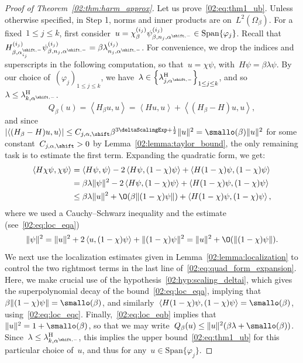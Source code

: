 \begin{proof}[Proof of Theorem~\ref{02:thm:harm_approx}]
        Let us prove~\eqref{02:eq:thm1_ub}. Unless otherwise specified, in Step 1, norms and inner products are on~$L^2(\Omega_\beta)$.
        For a fixed~$1\leq j\leq k$, first consider~$u = \chi_\beta^{(i_j)} \psi_{\beta,n_j,\alpha^{\shift,-}}^{(i_j)} \in \mathrm{Span}\{\varphi_j\}$. Recall that~$H_{\beta,\alpha_{i_j}^{\shift,-}}^{(i_j)}\psi_{\beta,n_j,\alpha^{\shift,-}}^{(i_j)} = \beta \lambda_{n_j,\alpha^{\shift,-}}^{(i_j)}$. For convenience, we drop the indices and superscripts in the following computation, so that~${u=\chi\psi}$, with~$H \psi = \beta\lambda\psi$.
        By our choice of~$(\varphi_j)_{1\leq j\leq k}$, we have~${\lambda \in \left\{\lambda_{j,\alpha^{\shift,-}}^{\mathrm H}\right\}_{1\leq j\leq k}}$, and so~$\lambda\leq \lambda_{k,\alpha^{\shift,-}}^{\mathrm H}$.
        \[Q_\beta(u)=\left\langle H_\beta u,u\right\rangle= \left\langle H u,u\right\rangle + \left\langle (H_\beta - H)u,u\right\rangle,\]
        and since~$\left|\left\langle (H_\beta-H)u,u\right\rangle\right| \leq C_{j,\alpha,\shift}\beta^{3\deltaScalingExp+\frac12}\|u\|^2 = \smallo(\beta)\|u\|^2$ for some constant~$C_{j,\alpha,\shift}>0$ by Lemma~\ref{02:lemma:taylor_bound}, the only remaining task is to estimate the first term.
        Expanding the quadratic form, we get:
        \begin{equation}\begin{aligned}
            \label{02:eq:quad_form_expansion}
            \left\langle H\chi\psi,\chi\psi\right\rangle &= \left\langle H\psi,\psi\right\rangle - 2\left\langle H\psi,(1-\chi)\psi\right\rangle + \left\langle H(1-\chi)\psi,(1-\chi)\psi\right\rangle\\
            & = \beta\lambda\|\psi\|^2 - 2\left\langle H\psi,(1-\chi)\psi\right\rangle + \left\langle H(1-\chi)\psi,(1-\chi)\psi\right\rangle\\
            &\leq \beta\lambda\|u\|^2 + \O(\beta\|(1-\chi)\psi\|) + \left\langle H(1-\chi)\psi,(1-\chi)\psi\right\rangle,\\
        \end{aligned}
    \end{equation}
        where we used a Cauchy--Schwarz inequality and the estimate (see~\eqref{02:eq:loc_eqa})
        \[\|\psi\|^2 = \|u\|^2 + 2\left\langle u,(1-\chi)\psi\right\rangle + \|(1-\chi)\psi\|^2 = \|u\|^2 + \O(\|(1-\chi)\psi\|).\]
        We next use the localization estimates given in Lemma~\ref{02:lemma:localization} to control the two rightmost terms in the last line of~\eqref{02:eq:quad_form_expansion}. Here, we make crucial use of the hypothesis~\eqref{02:hyp:scaling_deltai},
        which gives the superpolynomial decay of the bound~\eqref{02:eq:loc_eqa}, implying that~$\beta\|(1-\chi)\psi\|=\smallo(\beta)$, and similarly~$\left\langle H(1-\chi)\psi,(1-\chi)\psi\right\rangle = \smallo(\beta)$, using~\eqref{02:eq:loc_eqc}.
        Finally,~\eqref{02:eq:loc_eqb} implies that~$\|u\|^2 = 1 + \smallo(\beta)$, so that we may write~$Q_\beta(u)\leq \|u\|^2(\beta\lambda + \smallo(\beta))$.
        Since~$\lambda\leq \lambda_{k,\alpha^{\shift,-}}^{\mathrm H}$, this implies the upper bound~\eqref{02:eq:thm1_ub} for this particular choice of~$u$, and thus for any~$u\in \mathrm{Span}\{\varphi_j\}$.
        

\end{proof}

